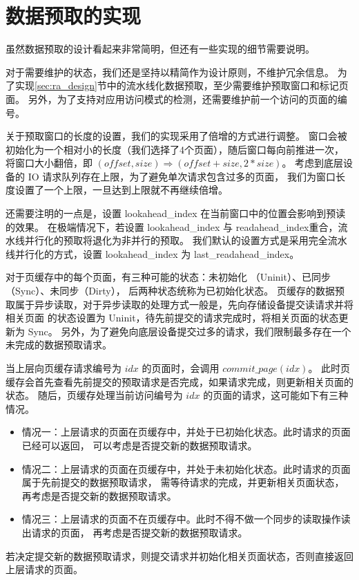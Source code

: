 \section{数据预取的实现}
虽然数据预取的设计看起来非常简明，但还有一些实现的细节需要说明。

对于需要维护的状态，我们还是坚持以精简作为设计原则，不维护冗余信息。
为了实现\ref{sec:ra_design}节中的流水线化数据预取，至少需要维护预取窗口和标记页面。
另外，为了支持对应用访问模式的检测，还需要维护前一个访问的页面的编号。

关于预取窗口的长度的设置，我们的实现采用了倍增的方式进行调整。
窗口会被初始化为一个相对小的长度（我们选择了4个页面），随后窗口每向前推进一次，
将窗口大小翻倍，即 $ (offset, size) \Rightarrow (offset + size, 2*size) $。
考虑到底层设备的 IO 请求队列存在上限，为了避免单次请求包含过多的页面，
我们为窗口长度设置了一个上限，一旦达到上限就不再继续倍增。

还需要注明的一点是，设置 lookahead\_index 在当前窗口中的位置会影响到预读的效果。
在极端情况下，若设置 lookahead\_index 与 readahead\_index重合，流水线并行化的预取将退化为非并行的预取。
我们默认的设置方式是采用完全流水线并行化的方式，设置 lookahead\_index 为 last\_readahead\_index。

对于页缓存中的每个页面，有三种可能的状态：未初始化 （Uninit）、已同步 （Sync）、未同步（Dirty），
后两种状态统称为已初始化状态。
页缓存的数据预取属于异步读取，对于异步读取的处理方式一般是，先向存储设备提交读请求并将相关页面
的状态设置为 Uninit，待先前提交的请求完成时，将相关页面的状态更新为 Sync。
另外，为了避免向底层设备提交过多的请求，我们限制最多存在一个未完成的数据预取请求。

当上层向页缓存请求编号为 $ idx $ 的页面时，会调用 $ commit\_page(idx) $。
此时页缓存会首先查看先前提交的预取请求是否完成，如果请求完成，则更新相关页面的状态。
随后，页缓存处理当前访问编号为 $ idx $ 的页面的请求，这可能如下有三种情况。
\begin{itemize}
    \item 情况一：上层请求的页面在页缓存中，并处于已初始化状态。此时请求的页面已经可以返回，
    可以考虑是否提交新的数据预取请求。
    \item 情况二：上层请求的页面在页缓存中，并处于未初始化状态。此时请求的页面属于先前提交的数据预取请求，
    需等待请求的完成，并更新相关页面状态，再考虑是否提交新的数据预取请求。
    \item 情况三：上层请求的页面不在页缓存中。此时不得不做一个同步的读取操作读出请求的页面，
    再考虑是否提交新的数据预取请求。
\end{itemize}
若决定提交新的数据预取请求，则提交请求并初始化相关页面状态，否则直接返回上层请求的页面。

